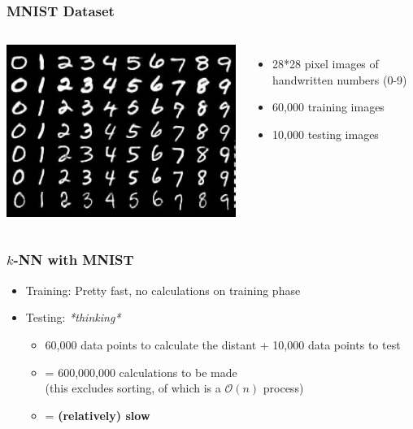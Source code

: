 \documentclass[aspectratio=169]{beamer}
\begin{document}
\begin{frame}
	\frametitle{MNIST Dataset}
	\begin{columns}
		\includegraphics[width=1.0\textwidth]{imgs/mnist.jpeg}
		\begin{itemize}
			\item<2-> 28*28 pixel images of handwritten numbers (0-9)
			\item<3-> 60,000 training images
			\item<4-> 10,000 testing images
		\end{itemize}
	\end{columns}
\end{frame}

\begin{frame}
	\frametitle{$k$-NN with MNIST}
	\begin{itemize}
		\item Training: Pretty fast, no calculations on training phase
		\item Testing: \textit{*thinking*}
		      \begin{itemize}
			      \item 60,000 data points to calculate the distant + 10,000 data points to test
			      \item = 600,000,000 calculations to be made\\
			            (this excludes sorting, of which is a $\mathcal{O}(n)$ process)
			      \item = \textbf{(relatively) slow}
		      \end{itemize}
	\end{itemize}
\end{frame}
\end{document}
